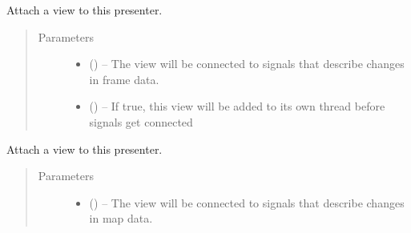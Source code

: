 \documentclass[letterpaper,10pt,english]{sphinxmanual}
\begin{document}
\begin{fulllineitems}

\begin{fulllineitems}
\label{\detokenize{xanespy:xanespy.qt_frameset_presenter.QtFramesetPresenter.active_timestep}}
\end{fulllineitems}


\begin{fulllineitems}
\label{\detokenize{xanespy:xanespy.qt_frameset_presenter.QtFramesetPresenter.add_frame_view}}
Attach a view to this presenter.
\begin{quote}\begin{description}
\item[{Parameters}] \leavevmode\begin{itemize}
\item {} 
 () -- The view will be connected to signals that describe changes in
frame data.

\item {} 
 (\sphinxstyleliteralemphasis{, }) -- If true, this view will be added to its own thread before
signals get connected

\end{itemize}

\end{description}\end{quote}

\end{fulllineitems}


\begin{fulllineitems}
\label{\detokenize{xanespy:xanespy.qt_frameset_presenter.QtFramesetPresenter.add_map_view}}
Attach a view to this presenter.
\begin{quote}\begin{description}
\item[{Parameters}] \leavevmode\begin{itemize}
\item {} 
 () -- The view will be connected to signals that describe changes in
map data.


\end{itemize}
\end{description}
\end{quote}
\end{fulllineitems}
\end{fulllineitems}
\end{document}
